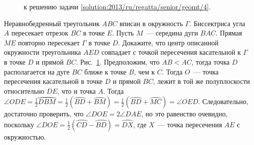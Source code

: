 \ifsolution
\begin{figure}\centering
    \caption{к решению задачи \ref{solution:2013/ru/regatta/senior/geomt/4}.}
    \label{fig:solution:2013/ru/regatta/senior/geomt/4}
\end{figure}
\fi %


\problem
Неравнобедренный треугольник $ABC$ вписан в окружность $\Gamma$.
Биссектриса угла $A$ пересекает отрезок $BC$ в точке $E$.
Пусть $M$~--- середина дуги $BAC$.
Прямая $ME$ повторно пересекает $\Gamma$ в точке $D$.
Докажите, что центр описанной окружности треугольника $AED$ совпадает с точкой
пересечения касательной к $\Gamma$ в точке $D$ и прямой $BC$.
\solution
\label{solution:2013/ru/regatta/senior/geomt/4}%
Рис.~\ref{fig:solution:2013/ru/regatta/senior/geomt/4}.
Предположим, что $AB < AC$, тогда точка $D$ располагается на дуге $BC$ ближе к
точке $B$, чем к $C$.
Тогда $O$~--- точка пересечения касательной в точке $D$ и прямой $BC$, лежит в
той же полуплоскости относительно $DE$, что и точка $A$.
Тогда
\(
    \angle ODE
=
    \frac{1}{2} \wideparen{DBM}
=
    \frac{1}{2}(\wideparen{BD} + \wideparen{BM})
=
    \frac{1}{2} (\wideparen{BD} + \wideparen{MC})
=
    \angle OED
\).
Следовательно, достаточно проверить, что $\angle DOE = 2\angle DAE$, но это
равенство очевидно, поскольку
$\angle DOE = \frac{1}{2} (\wideparen{CD}-\wideparen{BD}) = \wideparen{DX}$,
где $X$~--- точка пересечения $AE$ с окружностью.
\endproblem
